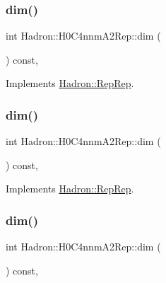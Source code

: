 \subsubsection{\texorpdfstring{dim()}{dim()}\hspace{0.1cm}{\footnotesize\ttfamily [3/5]}}
{\footnotesize\ttfamily int Hadron\+::\+H0\+C4nnm\+A2\+Rep\+::dim (\begin{DoxyParamCaption}{ }\end{DoxyParamCaption}) const\hspace{0.3cm}{\ttfamily [inline]}, {\ttfamily [virtual]}}



Implements \mbox{\hyperlink{structHadron_1_1RepRep_a92c8802e5ed7afd7da43ccfd5b7cd92b}{Hadron\+::\+Rep\+Rep}}.

\mbox{\label{structHadron_1_1H0C4nnmA2Rep_a71bbdee3d58a78ed81bfa8191f3df986}} 
\subsubsection{\texorpdfstring{dim()}{dim()}\hspace{0.1cm}{\footnotesize\ttfamily [4/5]}}
{\footnotesize\ttfamily int Hadron\+::\+H0\+C4nnm\+A2\+Rep\+::dim (\begin{DoxyParamCaption}{ }\end{DoxyParamCaption}) const\hspace{0.3cm}{\ttfamily [inline]}, {\ttfamily [virtual]}}



Implements \mbox{\hyperlink{structHadron_1_1RepRep_a92c8802e5ed7afd7da43ccfd5b7cd92b}{Hadron\+::\+Rep\+Rep}}.

\mbox{\label{structHadron_1_1H0C4nnmA2Rep_a71bbdee3d58a78ed81bfa8191f3df986}} 
\subsubsection{\texorpdfstring{dim()}{dim()}\hspace{0.1cm}{\footnotesize\ttfamily [5/5]}}
{\footnotesize\ttfamily int Hadron\+::\+H0\+C4nnm\+A2\+Rep\+::dim (\begin{DoxyParamCaption}{ }\end{DoxyParamCaption}) const\hspace{0.3cm}{\ttfamily [inline]}, {\ttfamily [virtual]}}



